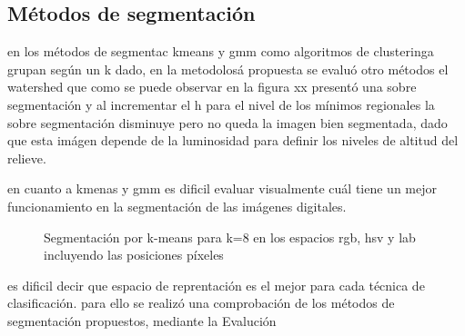 \documentclass[10pt,twocolumn,letterpaper]{article}
\begin{document}
\subsection{Métodos de segmentación}

en  los métodos de segmentac
kmeans y gmm como algoritmos de clusteringa grupan según un k dado, en la metodolosá propuesta se evaluó otro métodos
el watershed que como se puede observar en la figura xx presentó una sobre segmentación y al incrementar el h para el
nivel de los mínimos regionales la sobre segmentación disminuye pero no queda la imagen bien segmentada, dado que esta
imágen depende de la luminosidad para definir los niveles de altitud del relieve. 

en cuanto a kmenas y gmm es dificil evaluar visualmente cuál tiene un mejor funcionamiento en la segmentación de las imágenes 
digitales.
\begin{figure}[t]
\begin{center}
\end{center}
    \caption{Segmentaci\'on por k-means para k=8 en los espacios rgb, hsv y lab incluyendo las posiciones p\'ixeles}
\label{fig:long}
\label{fig:onecol}
\end{figure}
 

es dificil decir que espacio de reprentación es el mejor para cada técnica de clasificación.
para ello se realizó una comprobación de los métodos de segmentación propuestos, mediante la 
Evalución
\end{document}
